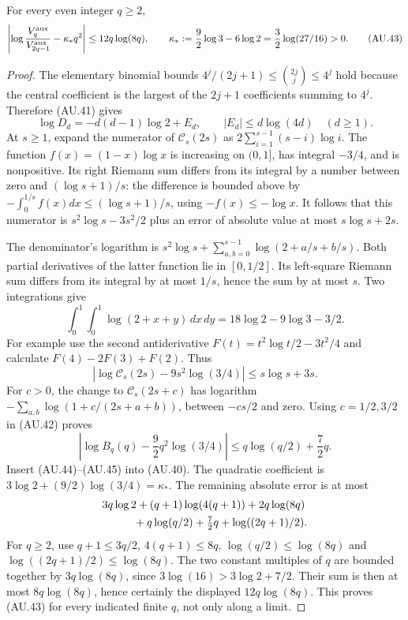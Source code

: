 \begin{theorem}
For every even integer $q\ge2$,
\[
 \left|\log\frac{V_q^{\rm aux}}{V_{2q-1}^{\rm aux}}
       -\kappa_*q^2\right|\le12q\log(8q),\qquad
 \kappa_*:=\frac92\log3-6\log2
           =\frac32\log(27/16)>0.                        \tag{AU.43}
\]
\end{theorem}
\begin{proof}
The elementary binomial bounds
$4^j/(2j+1)\le\binom{2j}{j}\le4^j$ hold because the central
coefficient is the largest of the $2j+1$ coefficients summing to
$4^j$. Therefore (AU.41) gives
\[
 \log D_d=-d(d-1)\log2+E_d,\qquad |E_d|\le d\log(4d)
 \quad(d\ge1).                                           \tag{AU.44}
\]
At $s\ge1$, expand the numerator of $\mathcal C_s(2s)$ as
$2\sum_{i=1}^{s-1}(s-i)\log i$. The function
$f(x)=(1-x)\log x$ is increasing on $(0,1]$, has integral $-3/4$,
and is nonpositive. Its right Riemann sum differs from its integral by
a number between zero and $(\log s+1)/s$: the difference is bounded
above by $-\int_0^{1/s}f(x)dx\le(\log s+1)/s$, using
$-f(x)\le-\log x$. It follows that this numerator is
$s^2\log s-3s^2/2$ plus an error of absolute value at most
$s\log s+2s$.

The denominator's logarithm is
$s^2\log s+\sum_{a,b=0}^{s-1}\log(2+a/s+b/s)$.
Both partial derivatives of the latter function lie in $[0,1/2]$.
Its left-square Riemann sum differs from its integral by at most
$1/s$, hence the sum by at most $s$. Two integrations give
\[
 \int_0^1\!\int_0^1\log(2+x+y)\,dx\,dy
       =18\log2-9\log3-3/2.
\]
For example use the second antiderivative
$F(t)=t^2\log t/2-3t^2/4$ and calculate $F(4)-2F(3)+F(2)$.
Thus
\[
 \left|\log\mathcal C_s(2s)-9s^2\log(3/4)\right|
          \le s\log s+3s.
\]
For $c>0$, the change to $\mathcal C_s(2s+c)$ has logarithm
$-\sum_{a,b}\log(1+c/(2s+a+b))$, between $-cs/2$ and zero.
Using $c=1/2,3/2$ in (AU.42) proves
\[
 \left|\log B_q(q)-\frac92q^2\log(3/4)\right|
          \le q\log(q/2)+\frac72q.                       \tag{AU.45}
\]
Insert (AU.44)--(AU.45) into (AU.40). The quadratic coefficient is
$3\log2+(9/2)\log(3/4)=\kappa_*$. The remaining absolute error
is at most
\[
 \begin{split}
 &3q\log2+(q+1)\log(4(q+1))+2q\log(8q)\\
 &\hspace{10mm}+q\log(q/2)+\tfrac72q+\log((2q+1)/2).
 \end{split}
\]
For $q\ge2$, use $q+1\le3q/2$, $4(q+1)\le8q$,
$\log(q/2)\le\log(8q)$ and $\log((2q+1)/2)\le\log(8q)$.
The two constant multiples of $q$ are bounded together by
$3q\log(8q)$, since $3\log(16)>3\log2+7/2$.
Their sum is then at most $8q\log(8q)$, hence certainly the
displayed $12q\log(8q)$. This proves (AU.43) for every indicated
finite $q$, not only along a limit.
\end{proof}

